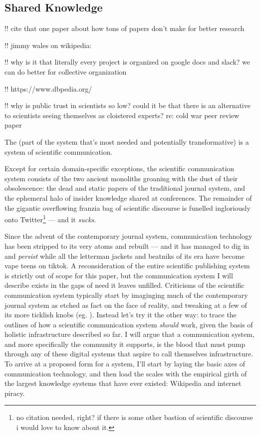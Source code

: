 \documentclass[10pt]{article}
\begin{document}
\hypertarget{shared-knowledge}{%
\subsection{Shared Knowledge}\label{shared-knowledge}}


\begin{multicols}{2}
 !! cite that one paper about how tons of papers don't make
for better research

!! jimmy wales on wikipedia:

!! why is it that literally every project is organized on google docs
and slack? we can do better for collective organization

!! https://www.dbpedia.org/

!! why is public trust in scientists so low? could it be that there is
an alternative to scientists seeing themselves as cloistered experts?
re: cold war peer review paper

The (part of the system that's most needed and potentially
transformative) is a system of scientific communication.

Except for certain domain-specific exceptions, the scientific
communication system consists of the two ancient monoliths groaning with
the dust of their obsolescence: the dead and static papers of the
traditional journal system, and the ephemeral halo of insider knowledge
shared at conferences. The remainder of the gigantic overflowing franzia
bag of scientific discourse is funelled ingloriously onto
Twitter\footnote{no citation needed, right? if there is some other
  bastion of scientific discourse i would love to know about it.} ---
and it \emph{sucks}.

Since the advent of the contemporary journal system, communication
technology has been stripped to its very atoms and rebuilt --- and it
has managed to dig in and \emph{persist} while all the letterman jackets
and beatniks of its era have become vape teens on tiktok. A
reconsideration of the entire scientific publishing system is strictly
out of scope for this paper, but the communication system I will
describe exists in the gaps of need it leaves unfilled. Criticisms of
the scientific communication system typically start by imaginging much
of the contemporary journal system as etched as fact on the face of
reality, and tweaking at a few of its more ticklish knobs (eg. \cite{heesenPeerReviewGood2020} ). Instead let's try it the other way: to
trace the outlines of how a scientific communication system
\emph{should} work, given the basis of holistic infrastructure described
so far. I will argue that a communication system, and more specifically
the community it supports, is the blood that must pump through any of
these digital systems that aspire to call themselves infrastructure. To
arrive at a proposed form for a system, I'll start by laying the basic
axes of communication technology, and then load the scales with the
empirical girth of the largest knowledge systems that have ever existed:
Wikipedia and internet piracy.


\end{multicols}
\end{document}
